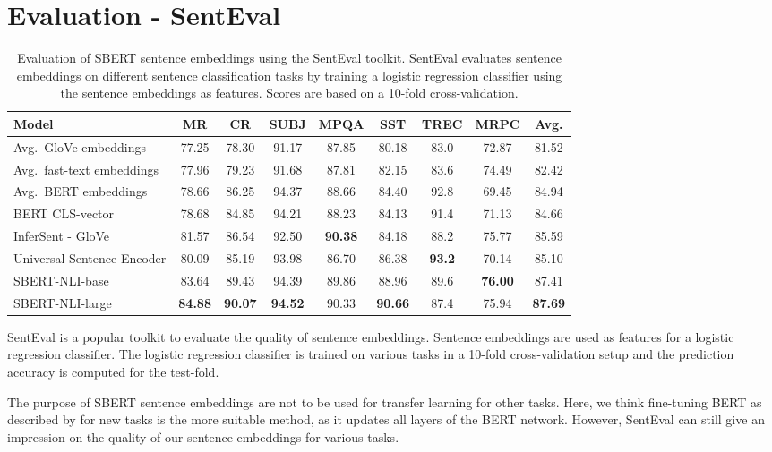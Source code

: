 \documentclass[11pt,a4paper]{article}
\begin{document}
\section{Evaluation - SentEval} \label{sec_eval_senteval}
\begin{table}[t]
	\centering 
	\footnotesize
	\begin{tabular}{|l|c|c|c|c|c|c|c||c|}
		\hline
		\textbf{Model} & \textbf{MR} & \textbf{CR} & \textbf{SUBJ} & \textbf{MPQA} & \textbf{SST} & \textbf{TREC} & \textbf{MRPC} & \textbf{Avg.} \\ \hline
		Avg.\ GloVe embeddings & 77.25 & 78.30 & 91.17 & 87.85 & 80.18 & 83.0 & 72.87 & 81.52 \\
		Avg.\ fast-text embeddings & 77.96 & 79.23 & 91.68 & 87.81 & 82.15 & 83.6 & 74.49 & 82.42 \\
		Avg.\ BERT embeddings & 78.66 & 86.25 & 94.37 & 88.66 &  84.40 & 92.8 & 69.45 & 84.94 \\
		BERT CLS-vector & 78.68 & 84.85 & 94.21 & 88.23 & 84.13 & 91.4 & 71.13 &  84.66 \\
		InferSent - GloVe & 81.57 & 86.54 & 92.50 & \textbf{90.38} & 84.18 & 88.2 & 75.77 & 85.59 \\
		Universal Sentence Encoder & 80.09 & 85.19 & 93.98 & 86.70 & 86.38 & \textbf{93.2} & 70.14 & 85.10 \\ \hline
		SBERT-NLI-base & 83.64 & 89.43 & 94.39 & 89.86 & 88.96 & 89.6 & \textbf{76.00} & 87.41 \\
		SBERT-NLI-large & \textbf{84.88} & \textbf{90.07} & \textbf{94.52} & 90.33 & \textbf{90.66} & 87.4 & 75.94 & \textbf{87.69} \\ \hline	
	\end{tabular}
	\caption{Evaluation of SBERT sentence embeddings using the SentEval toolkit. SentEval evaluates sentence embeddings on different sentence classification tasks by training a logistic regression classifier using the sentence embeddings as features. Scores are based on a 10-fold cross-validation.}
	\label{table_senteval}
\end{table}


SentEval \cite{conneau2018senteval} is a popular toolkit to evaluate the quality of sentence embeddings. Sentence embeddings are used as features for a logistic regression classifier. The logistic regression classifier is trained on various tasks in a 10-fold cross-validation setup and the prediction accuracy is computed for the test-fold. 

The purpose of SBERT sentence embeddings are not to be used for transfer learning for other tasks. Here, we think fine-tuning BERT as described by  for new tasks is the more suitable method, as it updates all layers of the BERT network. However, SentEval can still give an impression on the quality of our sentence embeddings for various tasks.
\end{document}
